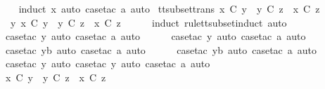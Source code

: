 %
\isadelimproof
\ \ %
\endisadelimproof
%
\isatagproof
{}\isamarkupfalse%
\ {\isacharparenleft}induct\ x{\isacharcomma}\ auto{\isacharcomma}\ case{\isacharunderscore}tac\ a{\isacharcomma}\ auto{\isacharparenright}%
\endisatagproof
{\isafoldproof}%
%
\isadelimproof
\isanewline
%
\endisadelimproof
\isanewline
{}\isamarkupfalse%
\ tt{\isacharunderscore}subset{\isacharunderscore}trans{\isacharcolon}\ {\isachardoublequoteopen}x\ {\isasymsubseteq}\isactrlsub C\ y\ {\isasymLongrightarrow}\ y\ {\isasymsubseteq}\isactrlsub C\ z\ {\isasymLongrightarrow}\ x\ {\isasymsubseteq}\isactrlsub C\ z{\isachardoublequoteclose}\isanewline
%
\isadelimproof
%
\endisadelimproof
%
\isatagproof
{}\isamarkupfalse%
\ {\isacharminus}\isanewline
\ \ \isamarkupfalse%
\ {\isachardoublequoteopen}{\isasymexists}\ y{\isachardot}\ x\ {\isasymsubseteq}\isactrlsub C\ y\ {\isasymand}\ y\ {\isasymsubseteq}\isactrlsub C\ z\ {\isasymLongrightarrow}\ x\ {\isasymsubseteq}\isactrlsub C\ z{\isachardoublequoteclose}\isanewline
\ \ \ \ \isamarkupfalse%
\ {\isacharparenleft}induct\ rule{\isacharcolon}tt{\isacharunderscore}subset{\isachardot}induct{\isacharcomma}\ auto{\isacharparenright}\isanewline
\ \ \ \ \isamarkupfalse%
\ {\isacharparenleft}case{\isacharunderscore}tac\ y{\isacharcomma}\ auto{\isacharcomma}\ case{\isacharunderscore}tac\ a{\isacharcomma}\ auto{\isacharparenright}\isanewline
\ \ \ \ \isamarkupfalse%
\ {\isacharparenleft}case{\isacharunderscore}tac\ y{\isacharcomma}\ auto{\isacharcomma}\ case{\isacharunderscore}tac\ a{\isacharcomma}\ auto{\isacharparenright}\isanewline
\ \ \ \ \isamarkupfalse%
\ {\isacharparenleft}case{\isacharunderscore}tac\ yb{\isacharcomma}\ auto{\isacharcomma}\ case{\isacharunderscore}tac\ a{\isacharcomma}\ auto{\isacharparenright}\isanewline
\ \ \ \ \isamarkupfalse%
\ {\isacharparenleft}case{\isacharunderscore}tac\ yb{\isacharcomma}\ auto{\isacharcomma}\ case{\isacharunderscore}tac\ a{\isacharcomma}\ auto{\isacharparenright}\isanewline
\ \ \ \ \isamarkupfalse%
\ {\isacharparenleft}case{\isacharunderscore}tac\ y{\isacharcomma}\ auto{\isacharcomma}\ case{\isacharunderscore}tac\ y{\isacharcomma}\ auto{\isacharcomma}\ case{\isacharunderscore}tac\ a{\isacharcomma}\ auto{\isacharparenright}{\isacharplus}\isanewline
\ \ \ \ \isamarkupfalse%
\ \ \isanewline
\ \ \isamarkupfalse%
\ \isamarkupfalse%
\ {\isachardoublequoteopen}x\ {\isasymsubseteq}\isactrlsub C\ y\ {\isasymLongrightarrow}\ y\ {\isasymsubseteq}\isactrlsub C\ z\ {\isasymLongrightarrow}\ x\ {\isasymsubseteq}\isactrlsub C\ z{\isachardoublequoteclose}\isanewline

